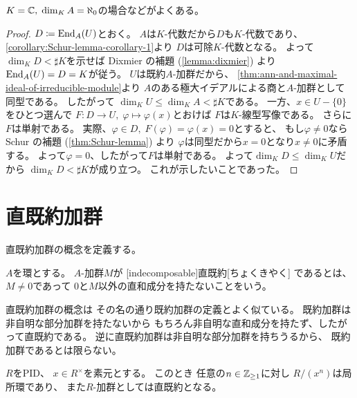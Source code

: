 \documentclass[report]{jlreq}
\begin{document}
\begin{remark}
    $K = \mathbb{C}, \; \dim_K A = \aleph_0$の場合などがよくある。
\end{remark}

\begin{proof}
    $D \coloneqq \operatorname{End}_A(U)$とおく。
    $A$は$K$-代数だから$D$も$K$-代数であり、
    \cref{corollary:Schur-lemma-corollary-1}より
    $D$は可除$K$-代数となる。
    よって$\dim_K D < \sharp K$を示せば
    Dixmier の補題 (\cref{lemma:dixmier}) より
    $\operatorname{End}_A(U) = D = K$が従う。
    $U$は既約$A$-加群だから、
    \cref{thm:ann-and-maximal-ideal-of-irreducible-module}より
    $A$のある極大イデアルによる商と$A$-加群として同型である。
    したがって
    $\dim_K U \le \dim_K A < \sharp K$である。
    一方、$x \in U - \{ 0 \}$をひとつ選んで
    $F \colon D \to U, \; \varphi \mapsto \varphi(x)$とおけば
    $F$は$K$-線型写像である。
    さらに$F$は単射である。
    実際、$\varphi \in D, \; F(\varphi) = \varphi(x) = 0$とすると、
    もし$\varphi \neq 0$なら
    Schur の補題 (\cref{thm:Schur-lemma}) より
    $\varphi$は同型だから$x = 0$となり$x \neq 0$に矛盾する。
    よって$\varphi = 0$、したがって$F$は単射である。
    よって$\dim_K D \le \dim_K U$だから
    $\dim_K D < \sharp K$が成り立つ。
    これが示したいことであった。
\end{proof}

%
\section{直既約加群}

直既約加群の概念を定義する。

\begin{definition}[直既約]
    $A$を環とする。
    $A$-加群$M$が
    [indecomposable]{直既約}[ちょくきやく]
    であるとは、
    $M \neq 0$であって
    $0$と$M$以外の直和成分を持たないことをいう。
\end{definition}

\begin{remark}
    直既約加群の概念は
    その名の通り既約加群の定義とよく似ている。
    既約加群は非自明な部分加群を持たないから
    もちろん非自明な直和成分を持たず、したがって直既約である。
    逆に直既約加群は非自明な部分加群を持ちうるから、
    既約加群であるとは限らない。
\end{remark}

\begin{theorem}
    $R$をPID、
    $x \in R^\times$を素元とする。
    このとき
    任意の$n \in \mathbb{Z}_{\ge 1}$に対し
    $R / (x^n)$は局所環であり、
    また$R$-加群としては直既約となる。
\end{theorem}
\end{document}
